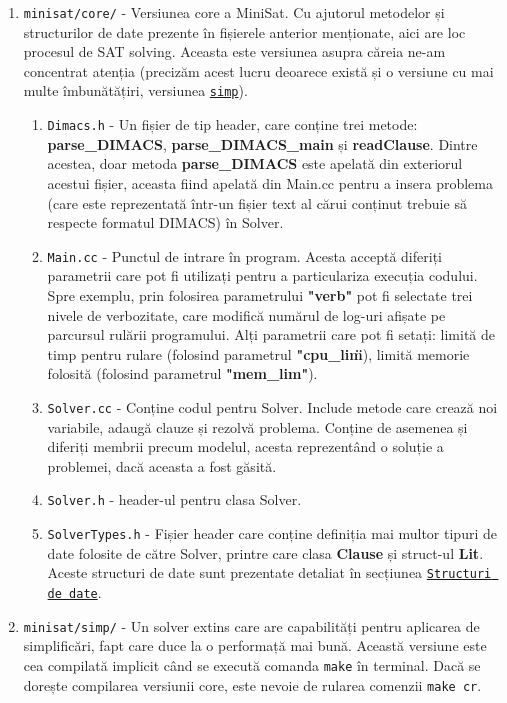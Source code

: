 \documentclass{llncs}
\begin{document}
\begin{enumerate}
    \item \texttt{minisat/core/} - Versiunea core a MiniSat. Cu ajutorul metodelor și structurilor de date prezente în fișierele anterior menționate, aici are loc procesul de SAT solving. Aceasta este versiunea asupra căreia ne-am concentrat atenția (precizăm acest lucru deoarece există și o versiune cu mai multe îmbunătățiri, versiunea \hyperref[item:simp]{\texttt{simp}}).
    \begin{enumerate}
        \item \texttt{Dimacs.h} - Un fișier de tip header, care conține trei metode: \textbf{parse\_DIMACS}, \textbf{parse\_DIMACS\_main} și \textbf{readClause}. 
Dintre acestea, doar metoda \textbf{parse\_DIMACS} este apelată din exteriorul acestui fișier, aceasta fiind apelată din Main.cc pentru a insera problema (care este reprezentată într-un fișier text al cărui conținut trebuie să respecte formatul DIMACS) în Solver.
        \item \texttt{Main.cc} - Punctul de intrare în program. Acesta acceptă diferiți parametrii care pot fi utilizați pentru a particulariza execuția codului. Spre exemplu, prin folosirea parametrului \textbf{"verb"} pot fi selectate trei nivele de verbozitate, care modifică numărul de log-uri afișate pe parcursul rulării programului. 
Alți parametrii care pot fi setați: limită de timp pentru rulare (folosind parametrul \textbf{"cpu\_lim\"}), limită memorie folosită (folosind parametrul \textbf{"mem\_lim"}).
        \item \texttt{Solver.cc} - Conține codul pentru Solver. Include metode care crează noi variabile, adaugă clauze și rezolvă problema. Conține de asemenea și diferiți membrii precum modelul, acesta reprezentând o soluție a problemei, dacă aceasta a fost găsită.
        \item \texttt{Solver.h} - header-ul pentru clasa Solver.
        \item \texttt{SolverTypes.h} - Fișier header care conține definiția mai multor tipuri de date folosite de către Solver, printre care clasa \textbf{Clause} și struct-ul \textbf{Lit}. Aceste structuri de date sunt prezentate detaliat în secțiunea \hyperref[sec:data_structures]{\texttt{Structuri de date}}.
    \end{enumerate}
    \item \texttt{minisat/simp/} - Un solver extins care are capabilități pentru aplicarea de simplificări, fapt care duce la o performață mai bună. Această versiune este cea compilată implicit când se execută comanda \texttt{make} în terminal. Dacă se dorește compilarea versiunii core, este nevoie de rularea comenzii \texttt{make cr}.
    \label{item:simp}
\end{enumerate}
\end{document}
